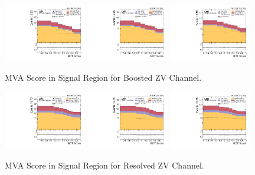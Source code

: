 \begin{figure}[!ht]
  \centering
  \includegraphics[width=0.32\textwidth]{analysis_plots/2016_zv/sr_l/mva_score_zv_var2_log.pdf}
  \includegraphics[width=0.32\textwidth]{analysis_plots/2017_zv/sr_l/mva_score_zv_var2_log.pdf}
  \includegraphics[width=0.32\textwidth]{analysis_plots/2018_zv/sr_l/mva_score_zv_var2_log.pdf} \\
  \caption[MVA Score in Signal Region for Boosted ZV Channel]%
  {MVA Score in Signal Region for Boosted ZV Channel.}%
  \label{fig:zv-sr-l-mva-score}
\end{figure}

\begin{figure}[!ht]
  \centering
  \includegraphics[width=0.32\textwidth]{analysis_plots/2016_zjj/sr_l/mva_score_zjj_var2_log.pdf}
  \includegraphics[width=0.32\textwidth]{analysis_plots/2017_zjj/sr_l/mva_score_zjj_var2_log.pdf}
  \includegraphics[width=0.32\textwidth]{analysis_plots/2018_zjj/sr_l/mva_score_zjj_var2_log.pdf} \\
  \caption[MVA Score in Signal Region for Resolved ZV Channel]%
  {MVA Score in Signal Region for Resolved ZV Channel.}%
  \label{fig:zjj-sr-l-mva-score}
\end{figure}

